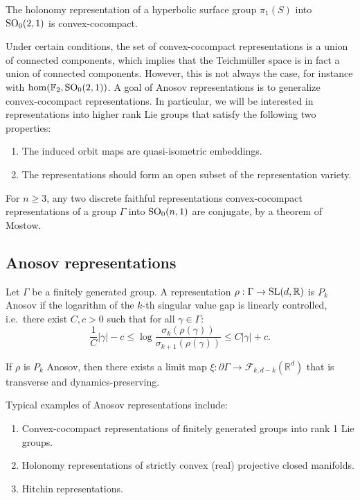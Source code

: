 \documentclass{report}
\begin{document}
\begin{example}
    The holonomy representation of a hyperbolic surface group $\pi_1(S)$ into $\operatorname{{\mathrm{SO}}}_0(2,1)$ is convex-cocompact.
\end{example}
Under certain conditions, the set of convex-cocompact representations is a union of connected components, which implies that the Teichmüller space is in fact a union of connected components.
However, this is not always the case, for instance with $\hom(\mathbb F_2, \operatorname{{\mathrm{SO}}}_0(2,1))$.
A goal of Anosov representations is to generalize convex-cocompact representations.
In particular, we will be interested in representations into higher rank Lie groups that satisfy the following two properties:
\begin{enumerate}
    \item The induced orbit maps are quasi-isometric embeddings.
    \item The representations should form an open subset of the representation variety.
\end{enumerate}
\begin{remark}
    For $n \geq 3$, any two discrete faithful representations convex-cocompact representations of a group $\Gamma$ into $\operatorname{{\mathrm{SO}}}_0(n,1)$ are conjugate, by a theorem of Mostow.
\end{remark}

\subsection{Anosov representations}
\begin{definition}
    Let $\Gamma$ be a finitely generated group.
    A representation $\rho:\Gamma \to \operatorname{{\mathrm{SL}}}(d,\mathbb R)$ is $P_k$ Anosov if the logarithm of the $k$-th singular value gap is linearly controlled, i.e.\ there exist $C, c>0$ such that for all $\gamma \in \Gamma$:
    \[
    \frac{1}{C} |\gamma| - c \leq \log \frac{\sigma_k(\rho(\gamma))}{\sigma_{k+1}(\rho(\gamma))} \leq C |\gamma| + c.
    \]
\end{definition}
If $\rho$ is $P_k$ Anosov, then there exists a limit map $\xi: \partial \Gamma \to \mathcal F_{k, d-k}(\mathbb R^d)$ that is transverse and dynamics-preserving.
\begin{example}
    Typical examples of Anosov representations include:
    \begin{enumerate}[label=(\roman*)]
        \item Convex-cocompact representations of finitely generated groups into rank 1 Lie groups.
        \item Holonomy representations of strictly convex (real) projective closed manifolds.
        \item Hitchin representations.
    \end{enumerate}
\end{example}
\end{document}
